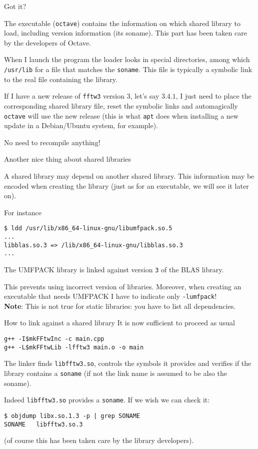 \documentclass[10pt]{beamer}
\begin{document}
\begin{frame}{Got it?}  

  The executable (\texttt{octave}) contains the
  information on which shared library to load, including version
  information (its soname). This part has been taken care by the 
  developers of Octave.
  \smallskip

  When I launch the program the loader looks in special directories,
  among which \texttt{/usr/lib} for a file that matches the
  \texttt{soname}. This file is typically a symbolic link to the real
  file containing the library.  
  \medskip

  If I have a new release of \texttt{fftw3} version 3, let's say $3.4.1$,
  I just need to place the corresponding shared library file, reset the symbolic links and automagically \texttt{octave}
  will use the new release (this is what \texttt{apt} does when
  installing a new update in a Debian/Ubuntu system, for example).

  \smallskip

  No need to recompile anything!
\end{frame}


\begin{frame}[fragile]{Another nice thing about shared libraries} 

  A shared library may depend on another shared library. This information may be encoded  when creating the library
  (just as for an executable, we will see it later on).

  For instance
\begin{verbatim}
$ ldd /usr/lib/x86_64-linux-gnu/libumfpack.so.5
...
libblas.so.3 => /lib/x86_64-linux-gnu/libblas.so.3
...
\end{verbatim}
The UMFPACK library is linked against version
\texttt{3} of the BLAS library. \smallskip

This prevents using incorrect version of
libraries. Moreover, when creating an executable that needs UMFPACK I have to indicate only
\texttt{-lumfpack}! \\
\textbf{Note}: This is not true for static libraries: you have to list all dependencies.
\end{frame}

\begin{frame}[fragile]{How to link against a shared library}   
  It is now sufficient to proceed as usual
\begin{verbatim}
g++ -I$mkFFtwInc -c main.cpp
g++ -L$mkFFtwLib -lfftw3 main.o -o main
\end{verbatim}

The linker finds \texttt{libfftw3.so}, controls the symbols it
provides and verifies if the library contains a
\texttt{soname} (if not the link name is assumed to be also the
soname).

Indeed \texttt{libfftw3.so} provides a \texttt{soname}. If we wish we
can check it:
\begin{verbatim}
$ objdump libx.so.1.3 -p | grep SONAME
SONAME   libfftw3.so.3
\end{verbatim}
(of course this has been taken care by the library developers).
\end{frame}
\end{document}
